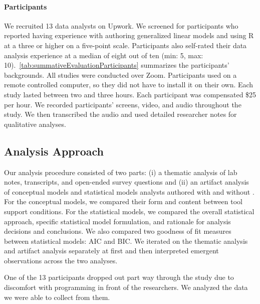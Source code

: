 \noindent \paragraph{Participants} We recruited 13 data analysts on Upwork. We
screened for participants who reported having experience with authoring
generalized linear models and using R at a three or higher on a five-point
scale. Participants also self-rated their data analysis experience at a median of eight out of ten (min: 5, max: 10).~\autoref{tab:summativeEvaluationParticipants} summarizes the
participants' backgrounds. All studies were conducted over Zoom. Participants used \rTisane
on a remote controlled computer, so they did not have to install it on their
own. Each study lasted between two and three hours. Each participant was compensated
\$25 per hour. We recorded participants' screens, video, and audio throughout
the study. We then transcribed the audio and used detailed researcher notes for
qualitative analyses.

\tableSummativeEvalParticipants

\subsection{Analysis Approach}
Our analysis procedure consisted of two parts: (i) a thematic analysis of lab
notes, transcripts, and open-ended survey questions and (ii) an artifact
analysis of conceptual models and statistical models analysts authored with and
without \rTisane. For the conceptual models, we compared their form and content
between tool support conditions. For the statistical models, we compared the
overall statistical approach, specific statistical model formulation, and
rationale for analysis decisions and conclusions. We also compared two goodness
of fit measures between statistical models: AIC and BIC. We iterated on the
thematic analysis and artifact analysis separately at first and then interpreted
emergent observations across the two analyses. 

One of the 13 participants dropped out part way through the study due to
discomfort with programming in front of the researchers. We analyzed the data we
were able to collect from them. 

